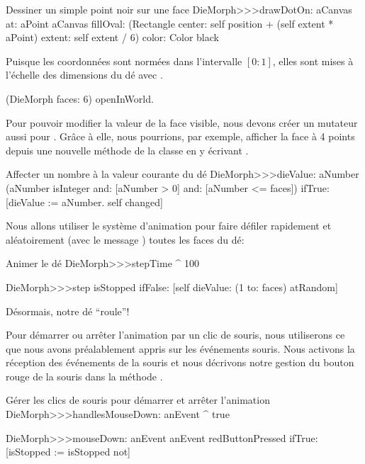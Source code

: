 \documentclass[a4paper,10pt,twoside]{book}
\begin{document}
\begin{method}{Dessiner un simple point noir sur une face}
DieMorph>>>drawDotOn: aCanvas at: aPoint
	aCanvas
		fillOval: (Rectangle
			center: self position + (self extent * aPoint)
			extent: self extent / 6)
		color: Color black
\end{method}

Puisque les coordonn\'ees sont norm\'ees dans l'intervalle $[0{:}1]$,
elles sont mises \`a l'\'echelle des dimensions du d\'e avec 
.

\begin{code}{}
(DieMorph faces: 6) openInWorld.
\end{code}

Pour pouvoir modifier la valeur de la face visible, nous devons
cr\'eer un mutateur aussi pour . 
Gr\^ace \`a elle, nous pourrions, par exemple, afficher la face \`a 4
points depuis une nouvelle m\'ethode de la classe en y \'ecrivant
.

\begin{method}{Affecter un nombre \`a la valeur courante du d\'e}
DieMorph>>>dieValue: aNumber
	(aNumber isInteger
			and: [aNumber > 0]
			and: [aNumber <= faces])
		ifTrue:
			[dieValue := aNumber.
			self changed]
\end{method}

Nous allons utiliser le syst\`eme d'animation pour faire d\'efiler rapidement 
et al\'eatoirement (avec le message ) toutes les faces du d\'e:
\begin{methods}{Animer le d\'e}
DieMorph>>>stepTime
	^ 100

DieMorph>>>step
	isStopped ifFalse: [self dieValue: (1 to: faces) atRandom]
\end{methods}
D\'esormais, notre d\'e ``roule''!

Pour d\'emarrer ou arr\^eter  l'animation par un clic de souris, nous
utiliserons ce que nous avons pr\'ealablement appris sur les
\'ev\'enements souris.
Nous activons la r\'eception des \'ev\'enements de la souris et nous
d\'ecrivons notre gestion du bouton rouge de la souris dans la
m\'ethode .       

\begin{methods}{G\'erer les clics de souris pour d\'emarrer et arr\^eter l'animation}
DieMorph>>>handlesMouseDown: anEvent
	^ true

DieMorph>>>mouseDown: anEvent
	anEvent redButtonPressed
		ifTrue: [isStopped := isStopped not]
\end{methods}
\end{document}
